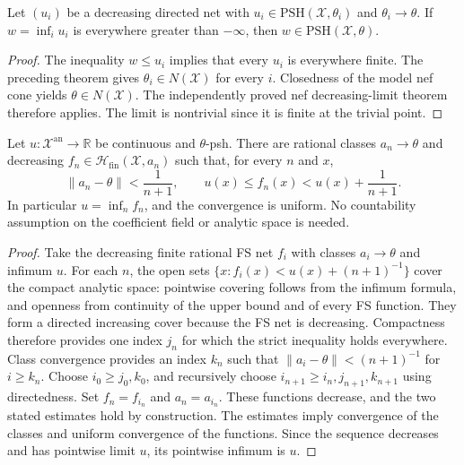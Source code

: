 \begin{theorem}
\label{thm:seven-finite-limit-psh2}
\leanok
Let $(u_i)$ be a decreasing directed net with
$u_i\in\mathrm{PSH}(\mathcal X,\theta_i)$ and $\theta_i\to\theta$.
If $w=\inf_i u_i$ is everywhere greater than $-\infty$, then
$w\in\mathrm{PSH}(\mathcal X,\theta)$.
\end{theorem}
\begin{proof}
The inequality $w\le u_i$ implies that every $u_i$ is everywhere finite.
The preceding theorem gives $\theta_i\in N(\mathcal X)$ for every $i$.
Closedness of the model nef cone yields $\theta\in N(\mathcal X)$.
The independently proved nef decreasing-limit theorem therefore applies.
The limit is nontrivial since it is finite at the trivial point.
\end{proof}

\begin{theorem}
\label{thm:seven-continuous-rational-fs-sequence}
\leanok
Let $u\colon\mathcal X^{\mathrm{an}}\to\mathbb R$ be continuous and
$\theta$-psh. There are rational classes $a_n\to\theta$ and decreasing
$f_n\in\mathcal H_{\mathrm{fin}}(\mathcal X,a_n)$ such that, for every
$n$ and $x$,
\[
 \|a_n-\theta\|<\frac1{n+1},\qquad
 u(x)\le f_n(x)<u(x)+\frac1{n+1}.
\]
In particular $u=\inf_n f_n$, and the convergence is uniform. No
countability assumption on the coefficient field or analytic space is needed.
\end{theorem}
\begin{proof}
Take the decreasing finite rational FS net $f_i$ with classes
$a_i\to\theta$ and infimum $u$. For each $n$, the open sets
$\{x:f_i(x)<u(x)+(n+1)^{-1}\}$ cover the compact analytic space:
pointwise covering follows from the infimum formula, and openness from
continuity of the upper bound and of every FS function. They form a
directed increasing cover because the FS net is decreasing. Compactness
therefore provides one index $j_n$ for which the strict inequality holds
everywhere. Class convergence provides an index $k_n$ such that
$\|a_i-\theta\|<(n+1)^{-1}$ for $i\ge k_n$.
Choose $i_0\ge j_0,k_0$, and recursively choose
$i_{n+1}\ge i_n,j_{n+1},k_{n+1}$ using directedness. Set $f_n=f_{i_n}$
and $a_n=a_{i_n}$. These functions decrease, and the two stated estimates
hold by construction. The estimates imply convergence of the classes and
uniform convergence of the functions. Since the sequence decreases and
has pointwise limit $u$, its pointwise infimum is $u$.
\end{proof}

